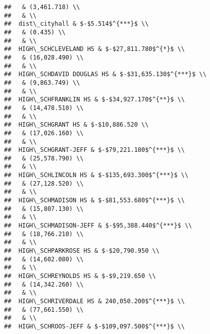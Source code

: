 \documentclass[]{article}
\begin{document}
\begin{verbatim}
##   & (3,461.718) \\ 
##   & \\ 
##  dist\_cityhall & $-$5.514$^{***}$ \\ 
##   & (0.435) \\ 
##   & \\ 
##  HIGH\_SCHCLEVELAND HS & $-$27,811.780$^{*}$ \\ 
##   & (16,028.490) \\ 
##   & \\ 
##  HIGH\_SCHDAVID DOUGLAS HS & $-$31,635.130$^{***}$ \\ 
##   & (9,863.749) \\ 
##   & \\ 
##  HIGH\_SCHFRANKLIN HS & $-$34,927.170$^{**}$ \\ 
##   & (14,478.510) \\ 
##   & \\ 
##  HIGH\_SCHGRANT HS & $-$10,886.520 \\ 
##   & (17,026.160) \\ 
##   & \\ 
##  HIGH\_SCHGRANT-JEFF & $-$79,221.180$^{***}$ \\ 
##   & (25,578.790) \\ 
##   & \\ 
##  HIGH\_SCHLINCOLN HS & $-$135,693.300$^{***}$ \\ 
##   & (27,128.520) \\ 
##   & \\ 
##  HIGH\_SCHMADISON HS & $-$81,553.680$^{***}$ \\ 
##   & (15,807.130) \\ 
##   & \\ 
##  HIGH\_SCHMADISON-JEFF & $-$95,388.440$^{***}$ \\ 
##   & (18,766.210) \\ 
##   & \\ 
##  HIGH\_SCHPARKROSE HS & $-$20,790.950 \\ 
##   & (14,602.080) \\ 
##   & \\ 
##  HIGH\_SCHREYNOLDS HS & $-$9,219.650 \\ 
##   & (14,342.260) \\ 
##   & \\ 
##  HIGH\_SCHRIVERDALE HS & 240,050.200$^{***}$ \\ 
##   & (77,661.550) \\ 
##   & \\ 
##  HIGH\_SCHROOS-JEFF & $-$109,097.500$^{***}$ \\ 

\end{verbatim}
\end{document}
